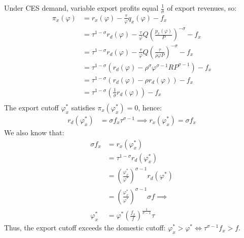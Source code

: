 \begin{solution}
	Under CES demand, variable export profits equal $\frac{1}{\sigma}$ of export revenues, so:
	\begin{align*}
		\pi_x(\varphi) &= r_x(\varphi) - \frac{\tau}{\varphi} q_x(\varphi) - f_x \\
		&= \tau^{1-\sigma} r_d(\varphi) - \frac{\tau}{\varphi}Q\left(\frac{p_x(\varphi)}{P}\right)^{-\sigma} - f_x \\
		&= \tau^{1-\sigma} r_d(\varphi) - \frac{\tau}{\varphi}Q\left(\frac{\tau}{\rho \varphi P}\right)^{-\sigma} - f_x \\
		&= \tau^{1-\sigma} \left( r_d(\varphi) - \rho^{\sigma} \varphi^{\sigma - 1} R P^{\sigma - 1} \right) - f_x \\
		&= \tau^{1-\sigma} \left( r_d(\varphi) - \rho r_d(\varphi) \right) - f_x \\
		&= \tau^{1-\sigma} \left( \frac{1}{\sigma} r_d(\varphi) \right) - f_x \\
	\end{align*}
	The export cutoff $\varphi_x^*$ satisfies $\pi_x(\varphi_x^*)=0$, hence:
	\begin{align*}
		r_d(\varphi_x^*) &= \sigma f_x \tau^{\sigma - 1} \implies r_x(\varphi_x^*) = \sigma f_x
	\end{align*}
	We also know that:
	\begin{align*}
		\sigma f_x &= r_x(\varphi_x^*)\\
		&= \tau^{1-\sigma} r_d(\varphi_x^*) \\
		&= \left( \frac{\varphi_x^*}{\varphi^*} \right)^{\sigma - 1} r_d(\varphi^*) \\
		&= \left( \frac{\varphi_x^*}{\varphi^*} \right)^{\sigma - 1} \sigma f \implies \\
		\varphi_x^* &= \varphi^* \left( \frac{f_x}{f} \right)^{\frac{1}{\sigma - 1}} \tau
	\end{align*}
	Thus, the export cutoff exceeds the domestic cutoff: $\varphi_x^* > \varphi^* \iff \tau^{\sigma - 1} f_x > f$.


\end{solution}
